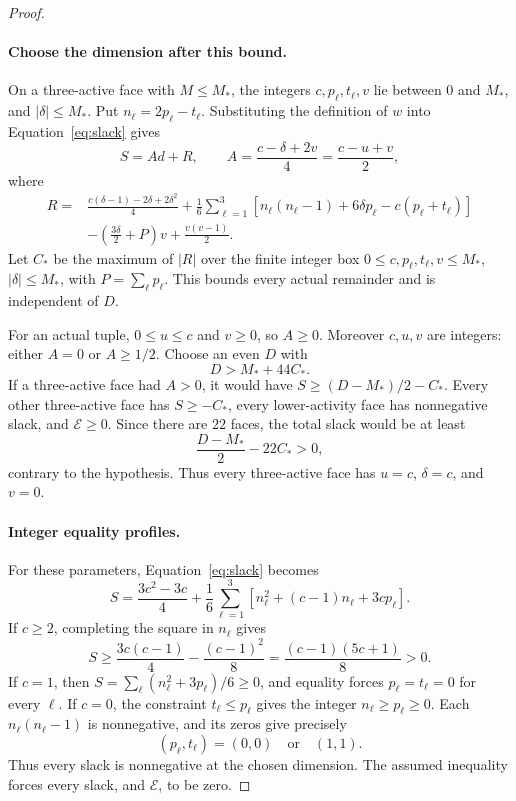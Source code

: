 \begin{proof}
\paragraph{Choose the dimension after this bound.}
On a three-active face with \(M\le M_*\), the integers
\(c,p_\ell,t_\ell,v\) lie between \(0\) and \(M_*\), and
\(|\delta|\le M_*\). Put \(n_\ell=2p_\ell-t_\ell\). Substituting the
definition of \(w\) into Equation~\eqref{eq:slack} gives
\begin{equation}\label{eq:tail-leading-coefficient}
 S=Ad+R,\qquad
 A=\frac{c-\delta+2v}{4}=\frac{c-u+v}{2},
\end{equation}
where
\[
\begin{split}
 R={}&\frac{c(\delta-1)-2\delta+2\delta^2}{4}
 +\frac16\sum_{\ell=1}^3
 \left[n_\ell(n_\ell-1)+6\delta p_\ell-c(p_\ell+t_\ell)\right]\\
 &-\left(\frac{3\delta}{2}+P\right)v+\frac{v(v-1)}2.
\end{split}
\]
Let \(C_*\) be the maximum of \(|R|\) over the finite integer box
\(0\le c,p_\ell,t_\ell,v\le M_*\), \(|\delta|\le M_*\), with
\(P=\sum_\ell p_\ell\). This bounds every actual remainder and is
independent of \(D\).

For an actual tuple, \(0\le u\le c\) and \(v\ge0\), so \(A\ge0\).
Moreover \(c,u,v\) are integers: either \(A=0\) or \(A\ge1/2\).
Choose an even \(D\) with
\[
 D>M_*+44C_*.
\]
If a three-active face had \(A>0\), it would have
\(S\ge(D-M_*)/2-C_*\). Every other three-active face has
\(S\ge-C_*\), every lower-activity face has nonnegative slack, and
\(\mathcal E\ge0\). Since there are \(22\) faces, the total slack
would be at least
\[
 \frac{D-M_*}{2}-22C_*>0,
\]
contrary to the hypothesis. Thus every three-active face has
\(u=c\), \(\delta=c\), and \(v=0\).

\paragraph{Integer equality profiles.}
For these parameters, Equation~\eqref{eq:slack} becomes
\begin{equation}\label{eq:tail-integer-slack}
 S=\frac{3c^2-3c}{4}
    +\frac16\sum_{\ell=1}^3
       \left[n_\ell^2+(c-1)n_\ell+3cp_\ell\right].
\end{equation}
If \(c\ge2\), completing the square in \(n_\ell\) gives
\[
 S\ge\frac{3c(c-1)}4-\frac{(c-1)^2}{8}
       =\frac{(c-1)(5c+1)}8>0.
\]
If \(c=1\), then \(S=\sum_\ell(n_\ell^2+3p_\ell)/6\ge0\),
and equality forces \(p_\ell=t_\ell=0\) for every \(\ell\).
If \(c=0\), the constraint \(t_\ell\le p_\ell\) gives the integer
\(n_\ell\ge p_\ell\ge0\). Each \(n_\ell(n_\ell-1)\) is nonnegative,
and its zeros give precisely
\[
 (p_\ell,t_\ell)=(0,0)\quad\text{or}\quad(1,1).
\]
Thus every slack is nonnegative at the chosen dimension. The assumed
inequality forces every slack, and \(\mathcal E\), to be zero.


\end{proof}
